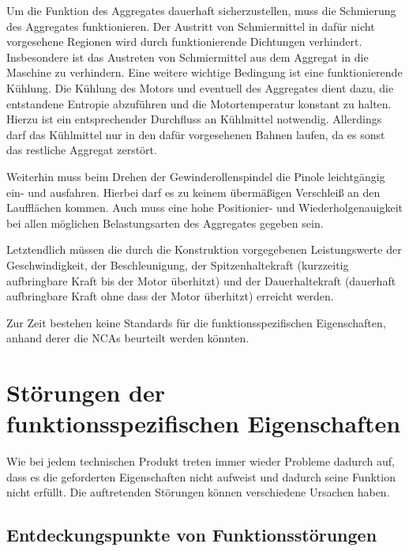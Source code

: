 Um die Funktion des Aggregates dauerhaft sicherzustellen, muss die Schmierung des Aggregates funktionieren. Der Austritt von Schmiermittel in dafür nicht vorgesehene Regionen wird durch funktionierende Dichtungen verhindert. Insbesondere ist das Austreten von Schmiermittel aus dem Aggregat in die Maschine zu verhindern. Eine weitere wichtige Bedingung ist eine funktionierende Kühlung. Die Kühlung des Motors und eventuell des Aggregates dient dazu, die entstandene Entropie abzuführen und die Motortemperatur konstant zu halten. Hierzu ist ein entsprechender Durchfluss an Kühlmittel notwendig. Allerdings darf das Kühlmittel nur in den dafür vorgesehenen Bahnen laufen, da es sonst das restliche Aggregat zerstört.

Weiterhin muss beim Drehen der Gewinderollenspindel die Pinole leichtgängig ein- und ausfahren. Hierbei darf es zu keinem übermäßigen Verschleiß an den Laufflächen kommen. Auch muss eine hohe Positionier- und Wiederholgenauigkeit bei allen möglichen Belastungsarten des Aggregates gegeben sein. 

Letztendlich müssen die durch die Konstruktion vorgegebenen Leistungswerte der Geschwindigkeit, der Beschleunigung, der Spitzenhaltekraft (kurzzeitig aufbringbare Kraft bis der Motor überhitzt) und der Dauerhaltekraft (dauerhaft aufbringbare Kraft ohne dass der Motor überhitzt) erreicht werden.

Zur Zeit bestehen keine Standards für die funktionsspezifischen Eigenschaften, anhand derer die NCAs beurteilt werden könnten.



\section{Störungen der funktionsspezifischen Eigenschaften}

Wie bei jedem technischen Produkt treten immer wieder Probleme dadurch auf, dass es die geforderten Eigenschaften nicht aufweist und dadurch seine Funktion nicht erfüllt.  Die auftretenden Störungen können verschiedene Ursachen haben. 

\subsection{Entdeckungspunkte von Funktionsstörungen} \label{cha:Entdecker_von_Funktionsstoerungen}





